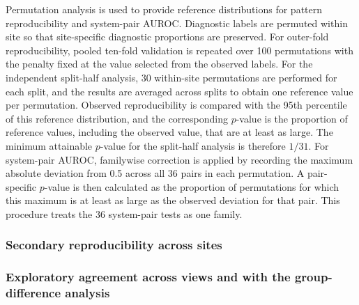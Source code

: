 Permutation analysis is used to provide reference distributions for pattern reproducibility and system-pair AUROC. Diagnostic labels are permuted within site so that site-specific diagnostic proportions are preserved. For outer-fold reproducibility, pooled ten-fold validation is repeated over 100 permutations with the penalty fixed at the value selected from the observed labels. For the independent split-half analysis, 30 within-site permutations are performed for each split, and the results are averaged across splits to obtain one reference value per permutation. Observed reproducibility is compared with the 95th percentile of this reference distribution, and the corresponding $p$-value is the proportion of reference values, including the observed value, that are at least as large. The minimum attainable $p$-value for the split-half analysis is therefore $1/31$. For system-pair AUROC, familywise correction is applied by recording the maximum absolute deviation from 0.5 across all 36 pairs in each permutation. A pair-specific $p$-value is then calculated as the proportion of permutations for which this maximum is at least as large as the observed deviation for that pair. This procedure treats the 36 system-pair tests as one family.

\subsubsection{Secondary reproducibility across sites}
\label{subsubsec:site-disjoint}


\subsubsection{Exploratory agreement across views and with the group-difference analysis}
\label{subsubsec:interpretation-agreement}

